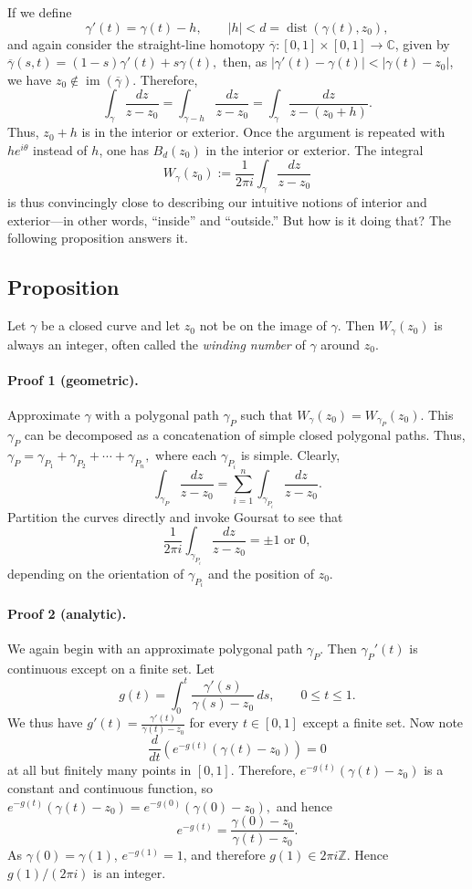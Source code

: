 \documentclass[11pt,a4paper]{article}
\begin{document}
If we define
\[
  \gamma'(t)=\gamma(t)-h,
  \qquad |h|<d=\operatorname{dist}(\gamma(t),z_0),
\]
and again consider the straight-line homotopy \(\overline{\gamma}:[0,1]\times[0,1]\to\mathbb C\), given by \(\overline{\gamma}(s,t)=(1-s)\gamma'(t)+s\gamma(t),\)
then, as \(|\gamma'(t)-\gamma(t)|<|\gamma(t)-z_0|\), we have \(z_0\notin\operatorname{im}(\overline{\gamma})\). Therefore,
\[
  \int_\gamma\frac{dz}{z-z_0}
  =\int_{\gamma-h}\frac{dz}{z-z_0}
  =\int_\gamma\frac{dz}{z-(z_0+h)}.
\]
Thus, \(z_0+h\) is in the interior or exterior. Once the argument is repeated with \(he^{i\theta}\) instead of \(h\), one has \(B_d(z_0)\) in the interior or exterior. The integral
\[
  W_\gamma(z_0):=\frac{1}{2\pi i}\int_\gamma\frac{dz}{z-z_0}
\]
is thus convincingly close to describing our intuitive notions of interior and exterior---in other words, ``inside'' and ``outside.'' But how is it doing that? The following proposition answers it.

\subsection*{Proposition}
Let \(\gamma\) be a closed curve and let \(z_0\) not be on the image of \(\gamma\). Then \(W_\gamma(z_0)\) is always an integer, often called the \emph{winding number} of \(\gamma\) around \(z_0\).

\paragraph{Proof 1 (geometric).}
Approximate \(\gamma\) with a polygonal path \(\gamma_P\) such that \(W_\gamma(z_0)=W_{\gamma_P}(z_0).\)
This \(\gamma_P\) can be decomposed as a concatenation of simple closed polygonal paths. Thus, \(\gamma_P=\gamma_{P_1}+\gamma_{P_2}+\cdots+\gamma_{P_n},\)
where each \(\gamma_{P_i}\) is simple. Clearly,
\[
  \int_{\gamma_P}\frac{dz}{z-z_0}
  =\sum_{i=1}^n\int_{\gamma_{P_i}}\frac{dz}{z-z_0}.
\]
Partition the curves directly and invoke Goursat to see that
\[
  \frac{1}{2\pi i}\int_{\gamma_{P_i}}\frac{dz}{z-z_0}=\pm1\text{ or }0,
\]
depending on the orientation of \(\gamma_{P_i}\) and the position of \(z_0\).

\paragraph{Proof 2 (analytic).}
We again begin with an approximate polygonal path \(\gamma_P\). Then \(\gamma_P'(t)\) is continuous except on a finite set. Let
\[
  g(t)=\int_0^t\frac{\gamma'(s)}{\gamma(s)-z_0}\,ds,
  \qquad 0\le t\le1.
\]
We thus have \(g'(t)=\frac{\gamma'(t)}{\gamma(t)-z_0}\)
for every \(t\in[0,1]\) except a finite set. Now note
\[
  \frac{d}{dt}\left(e^{-g(t)}(\gamma(t)-z_0)\right)=0
\]
at all but finitely many points in \([0,1]\). Therefore, \(e^{-g(t)}(\gamma(t)-z_0)\) is a constant and continuous function, so \(e^{-g(t)}(\gamma(t)-z_0)=e^{-g(0)}(\gamma(0)-z_0),\)
and hence
\[
  e^{-g(t)}=\frac{\gamma(0)-z_0}{\gamma(t)-z_0}.
\]
As \(\gamma(0)=\gamma(1)\), \(e^{-g(1)}=1\), and therefore \(g(1)\in2\pi i\mathbb Z\). Hence \(g(1)/(2\pi i)\) is an integer.
\end{document}
